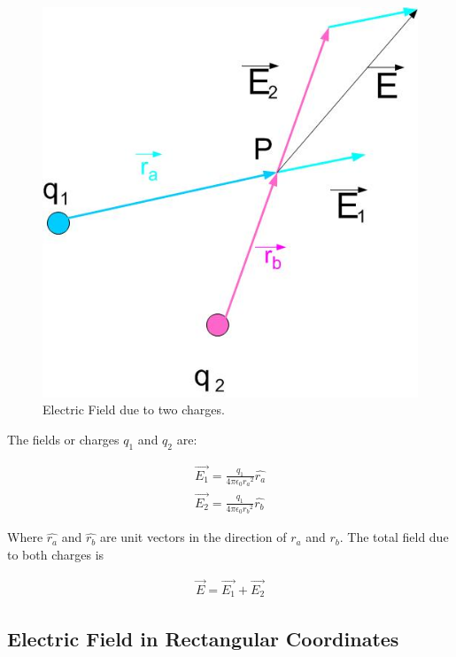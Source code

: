 \documentclass{ximera}
\begin{document}
\begin{figure}[htbp]
\begin{center}
\includegraphics[scale=0.5]{../jpg/superposition.jpg}
\end{center}
\caption{Electric Field due to two charges.}
\label{UnitCh}
\end{figure}

The fields or charges $q_1$ and $q_2$ are:

\begin{eqnarray}
\vec{E_1}=\frac{q_1}{4 \pi \epsilon_{0} {r_a}^2} \hat{r_a} \label{field}\\
\vec{E_2}=\frac{q_1}{4 \pi \epsilon_{0} {r_b}^2} \hat{r_b}
\end{eqnarray}

Where $\hat{r_a}$ and $\hat{r_b}$ are unit vectors in the direction of $r_a$ and $r_b$. The total field due to both charges is


\begin{eqnarray}
\vec{E}=\vec{E_1} + \vec{E_2} 
\end{eqnarray}






\subsection{Electric Field in Rectangular Coordinates}
\end{document}

